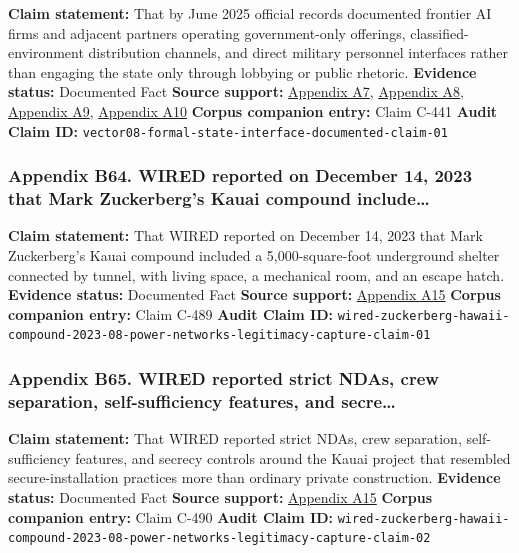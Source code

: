 \documentclass[
  american,
  11pt,
  letterpaper,
]{article}
\begin{document}
\textbf{Claim statement:} That by June 2025 official records documented
frontier AI firms and adjacent partners operating government-only
offerings, classified-environment distribution channels, and direct
military personnel interfaces rather than engaging the state only
through lobbying or public rhetoric. \textbf{Evidence status:}
Documented Fact \textbf{Source support:}
\hyperref[ch-08-appendix-a7-introducing-openai-for-government]{Appendix
A7},
\hyperref[ch-08-appendix-a8-claude-gov-models-for-u-s-national-security-customers]{Appendix
A8},
\hyperref[ch-08-appendix-a9-anthropic-and-palantir-partner-to-bring-claude-ai-models-to-aws-for-u-s-government-intelligence-and-defense-operations]{Appendix
A9},
\hyperref[ch-08-appendix-a10-army-launches-detachment-201-executive-innovation-corps-to-drive-tech-transformation]{Appendix
A10} \textbf{Corpus companion entry:} Claim C-441 \textbf{Audit Claim
ID:} \texttt{vector08-formal-state-interface-documented-claim-01}

\subsubsection{Appendix B64. WIRED reported on December 14, 2023 that
Mark Zuckerberg's Kauai compound
include\ldots{}}\label{ch-08-appendix-b64-wired-reported-on-december-14-2023-that-mark-zuckerberg-s-kauai-compound-include}

\textbf{Claim statement:} That WIRED reported on December 14, 2023 that
Mark Zuckerberg's Kauai compound included a 5,000-square-foot
underground shelter connected by tunnel, with living space, a mechanical
room, and an escape hatch. \textbf{Evidence status:} Documented Fact
\textbf{Source support:}
\hyperref[ch-08-appendix-a15-inside-mark-zuckerbergs-top-secret-hawaii-compound]{Appendix
A15} \textbf{Corpus companion entry:} Claim C-489 \textbf{Audit Claim
ID:}
\texttt{wired-zuckerberg-hawaii-compound-2023-08-power-networks-legitimacy-capture-claim-01}

\subsubsection{Appendix B65. WIRED reported strict NDAs, crew
separation, self-sufficiency features, and
secre\ldots{}}\label{ch-08-appendix-b65-wired-reported-strict-ndas-crew-separation-self-sufficiency-features-and-secre}

\textbf{Claim statement:} That WIRED reported strict NDAs, crew
separation, self-sufficiency features, and secrecy controls around the
Kauai project that resembled secure-installation practices more than
ordinary private construction. \textbf{Evidence status:} Documented Fact
\textbf{Source support:}
\hyperref[ch-08-appendix-a15-inside-mark-zuckerbergs-top-secret-hawaii-compound]{Appendix
A15} \textbf{Corpus companion entry:} Claim C-490 \textbf{Audit Claim
ID:}
\texttt{wired-zuckerberg-hawaii-compound-2023-08-power-networks-legitimacy-capture-claim-02}
\end{document}

